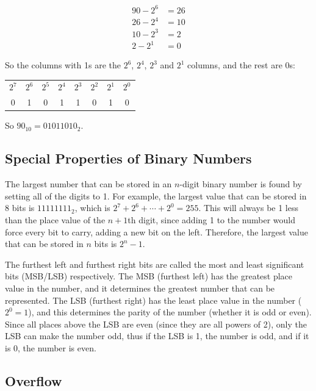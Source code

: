         \begin{equation*}
        \begin{aligned}
            90-2^6&=26 \\
            26-2^4&=10 \\
            10-2^3&=2 \\
            2-2^1&=0
        \end{aligned}
        \end{equation*}

        So the columns with 1s are the $2^6$, $2^4$, $2^3$ and $2^1$ columns, and the rest are 0s:
        \begin{center}
        \begin{tabular}{c c c c c c c c}
            $2^7$&$2^6$&$2^5$&$2^4$&$2^3$&$2^2$&$2^1$&$2^0$ \\
            0  &  1  &  0  &  1  &  1  &  0  &  1  &  0
        \end{tabular}
        \end{center}
        So $90_{10}=01011010_2$.

    \subsection{Special Properties of Binary Numbers}
        The largest number that can be stored in an $n$-digit binary number is found by setting all of the digits to 1.
        For example, the largest value that can be stored in 8 bits is $11111111_2$, which is $2^7+2^6+\cdots+2^0=255$.
        This will always be 1 less than the place value of the $n+1$th digit, since adding 1 to the number would force every bit to carry, adding a new bit on the left.
        Therefore, the largest value that can be stored in $n$ bits is $2^n-1$.

        The furthest left and furthest right bits are called the most and least significant bits (MSB/LSB) respectively.
        The MSB (furthest left) has the greatest place value in the number, and it determines the greatest number that can be represented.
        The LSB (furthest right) has the least place value in the number ($2^0=1$), and this determines the parity of the number (whether it is odd or even).
        Since all places above the LSB are even (since they are all powers of 2), only the LSB can make the number odd, thus if the LSB is 1, the number is odd, and if it is 0, the number is even.

    \subsection{Overflow}


